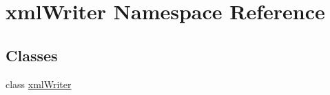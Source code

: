 \hypertarget{namespacexml_writer}{}\section{xml\+Writer Namespace Reference}
\label{namespacexml_writer}
\subsection*{Classes}
\begin{DoxyCompactItemize}
\item 
class \mbox{\hyperlink{classxml_writer_1_1xml_writer}{xml\+Writer}}
\end{DoxyCompactItemize}
